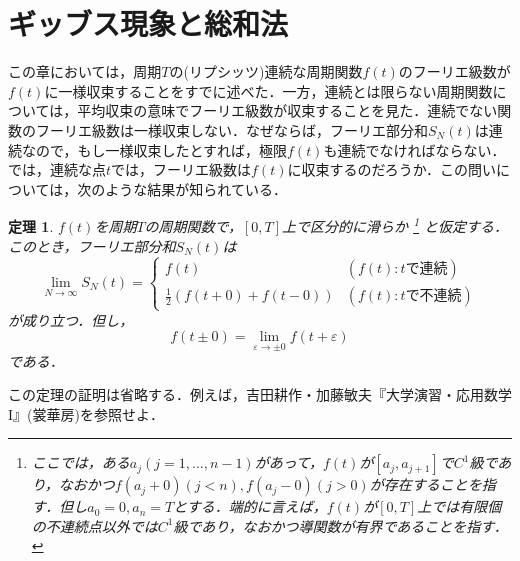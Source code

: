 \documentclass[a4j]{jsbook}
\newtheorem{theorem}{定理}
\numberwithin{theorem}{chapter}  %
\begin{document}
\section{ギッブス現象と総和法} \label{sec1-11}
この章においては，周期\(T\)の(リプシッツ)連続な周期関数\(f(t)\)のフーリエ級数が\(f(t)\)に一様収束することをすでに述べた．一方，連続とは限らない周期関数については，平均収束の意味でフーリエ級数が収束することを見た．連続でない関数のフーリエ級数は一様収束しない．なぜならば，フーリエ部分和\(S_N(t)\)は連続なので，もし一様収束したとすれば，極限\(f(t)\)も連続でなければならない．では，連続な点\(t\)では，フーリエ級数は\(f(t)\)に収束するのだろうか．この問いについては，次のような結果が知られている．
\begin{theorem}
\label{th1-13}
\(f(t)\)を周期\(T\)の周期関数で，\([0, T]\)上で区分的に滑らか
\footnote{
ここでは，ある\(a_j(j=1, \dots, n-1)\)があって，\(f(t)\)が\([a_j, a_{j+1}]\)で\(C^1\)級であり，なおかつ\(f(a_j+0)(j<n), f(a_j-0)(j>0)\)が存在することを指す．但し\(a_0=0, a_n=T\)とする．端的に言えば，\(f(t)\)が\([0, T]\)上では有限個の不連続点以外では\(C^1\)級であり，なおかつ導関数が有界であることを指す．
}
と仮定する．このとき，フーリエ部分和\(S_N(t)\)は
\begin{equation*}
    \lim_{N\to\infty}S_N(t)= \begin{cases}
    f(t) & (f(t):t\mbox{で連続}) \\
    \frac{1}{2}(f(t+0)+f(t-0)) & (f(t):t\mbox{で不連続})
    \end{cases}
\end{equation*}
が成り立つ．但し，
\begin{equation*}
    f(t\pm 0)=\lim_{\varepsilon\to\pm 0}f(t+\varepsilon)
\end{equation*}
である．
\end{theorem}
この定理の証明は省略する．例えば，吉田耕作・加藤敏夫『大学演習・応用数学I』(裳華房)を参照せよ．
\end{document}
